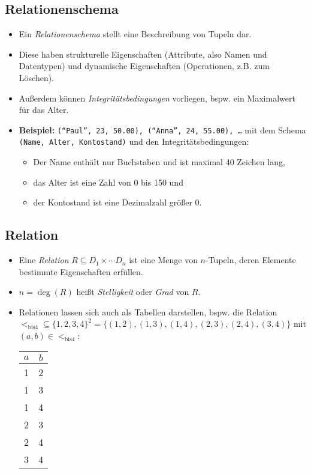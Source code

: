 	\subsection{Relationenschema} %
		\begin{itemize}
			\item Ein \textit{Relationenschema} stellt eine Beschreibung von Tupeln dar.
			\item Diese haben strukturelle Eigenschaften (Attribute, also Namen und Datentypen) und dynamische Eigenschaften (Operationen, z.B. zum Löschen).
			\item Außerdem können \textit{Integritätsbedingungen} vorliegen, bspw. ein Maximalwert für das Alter.
			\item \textbf{Beispiel:} \texttt{(\enquote{Paul}, 23, 50.00), (\enquote{Anna}, 24, 55.00), \dots} mit dem Schema \texttt{(Name, Alter, Kontostand)} und den Integritätsbedingungen:
				\begin{itemize}
					\item Der Name enthält nur Buchstaben und ist maximal 40 Zeichen lang,
					\item das Alter ist eine Zahl von 0 bis 150 und
					\item der Kontostand ist eine Dezimalzahl größer 0.
				\end{itemize}
		\end{itemize}

	\subsection{Relation} %
		\begin{itemize}
			\item Eine \textit{Relation} \( R \subseteq D _ 1 \times \cdots D _ n \) ist eine Menge von \(n\)-Tupeln, deren Elemente bestimmte Eigenschaften erfüllen.
			\item \( n = \deg(R) \) heißt \textit{Stelligkeit} oder \textit{Grad} von \(R\).
			\item Relationen lassen sich auch als Tabellen darstellen, bspw. die Relation \\ \( < _ \text{bis4} \subseteq \{ 1, 2, 3, 4 \} ^ 2 = \{ (1, 2), (1, 3), (1, 4), (2, 3), (2, 4), (3, 4) \} \) mit \( (a, b) \in < _ \text{bis4} \):
				\begin{table}[H]
					\centering
					\begin{tabular}{c | c}
						\(a\) & \(b\) \\ \hline
						1     & 2     \\
						1     & 3     \\
						1     & 4     \\
						2     & 3     \\
						2     & 4     \\
						3     & 4
					\end{tabular}
				\end{table}
		\end{itemize}


